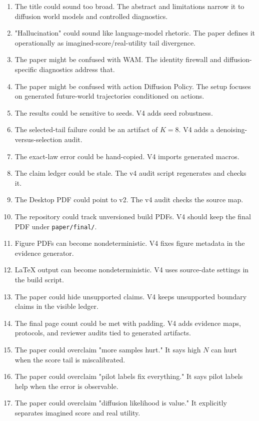 \documentclass{article}
\begin{document}
\begin{enumerate}
diffusion-specific contribution is the generated-future evidence package.
\item The title could sound too broad. The abstract and limitations narrow it
to diffusion world models and controlled diagnostics.
\item "Hallucination" could sound like language-model rhetoric. The paper
defines it operationally as imagined-score/real-utility tail divergence.
\item The paper might be confused with WAM. The identity firewall and
diffusion-specific diagnostics address that.
\item The paper might be confused with action Diffusion Policy. The setup
focuses on generated future-world trajectories conditioned on actions.
\item The results could be sensitive to seeds. V4 adds seed robustness.
\item The selected-tail failure could be an artifact of $K=8$. V4 adds a
denoising-versus-selection audit.
\item The exact-law error could be hand-copied. V4 imports generated macros.
\item The claim ledger could be stale. The v4 audit script regenerates and
checks it.
\item The Desktop PDF could point to v2. The v4 audit checks the source map.
\item The repository could track unversioned build PDFs. V4 should keep the
final PDF under \texttt{paper/final/}.
\item Figure PDFs can become nondeterministic. V4 fixes figure metadata in the
evidence generator.
\item LaTeX output can become nondeterministic. V4 uses source-date settings
in the build script.
\item The paper could hide unsupported claims. V4 keeps unsupported boundary
claims in the visible ledger.
\item The final page count could be met with padding. V4 adds evidence maps,
protocols, and reviewer audits tied to generated artifacts.
\item The paper could overclaim "more samples hurt." It says high $N$ can hurt
when the score tail is miscalibrated.
\item The paper could overclaim "pilot labels fix everything." It says pilot
labels help when the error is observable.
\item The paper could overclaim "diffusion likelihood is value." It explicitly
separates imagined score and real utility.

\end{enumerate}
\end{document}

